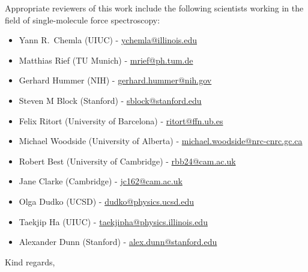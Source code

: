\documentclass[ucb,qb3,10pt,fullfrom]{ucletter}
\begin{document}
\begin{letter}{}

Appropriate reviewers of this work include the following scientists working in the field of single-molecule force spectroscopy:
\begin{itemize}
  \item Yann R.~Chemla (UIUC) - \url{ychemla@illinois.edu}
  \item Matthias Rief (TU Munich) - \url{mrief@ph.tum.de}
  \item Gerhard Hummer (NIH) - \url{gerhard.hummer@nih.gov}
  \item Steven M Block (Stanford) - \url{sblock@stanford.edu}
  \item Felix Ritort (University of Barcelona) - \url{ritort@ffn.ub.es}  
  \item Michael Woodside (University of Alberta) - \url{michael.woodside@nrc-cnrc.gc.ca}
  \item Robert Best (University of Cambridge) - \url{rbb24@cam.ac.uk}
  \item Jane Clarke (Cambridge) - \url{jc162@cam.ac.uk}
  \item Olga Dudko (UCSD) - \url{dudko@physics.ucsd.edu}
  \item Taekjip Ha (UIUC) - \url{taekjipha@physics.illinois.edu}
  \item Alexander Dunn (Stanford) - \url{alex.dunn@stanford.edu}
\end{itemize}

\closing{Kind regards,}
\end{letter}
\end{document}
